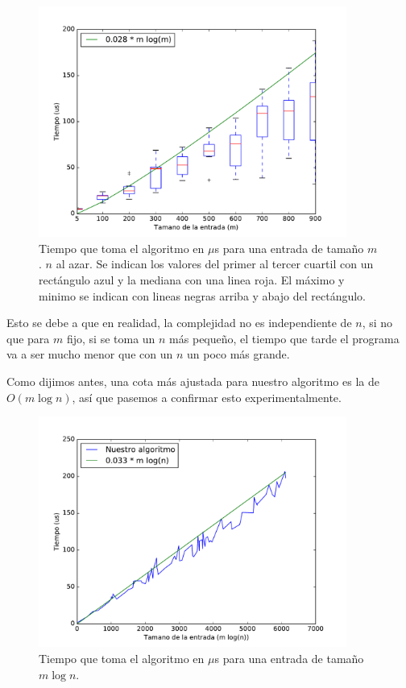\begin{figure}[H]
 \centering
	\includegraphics[width=0.9\textwidth]{img/exp/problema2-promedio2.pdf}
  \caption{\footnotesize Tiempo que toma el algoritmo en $\mu$s para una entrada de tamaño $m$. $n$ al azar. Se indican los valores del primer al tercer cuartil con un rectángulo azul y la mediana con una linea roja. El máximo y minimo se indican con lineas negras arriba y abajo del rectángulo.}
	\label{fig:problema2-promedio2}
\end{figure}

Esto se debe a que en realidad, la complejidad no es independiente de $n$, si no que para $m$ fijo, si se toma un $n$ más pequeño, el tiempo que tarde el programa va a ser mucho menor que con un $n$ un poco más grande.

Como dijimos antes, una cota más ajustada para nuestro algoritmo es la de $O(m \log n)$, así que pasemos a confirmar esto experimentalmente.

\begin{figure}[H]
 \centering
	\includegraphics[width=0.9\textwidth]{img/exp/problema2-posta.pdf}
	\caption{\footnotesize Tiempo que toma el algoritmo en $\mu$s para una entrada de tamaño $m \log n$.}
	\label{fig:problema2-posta}
\end{figure}

